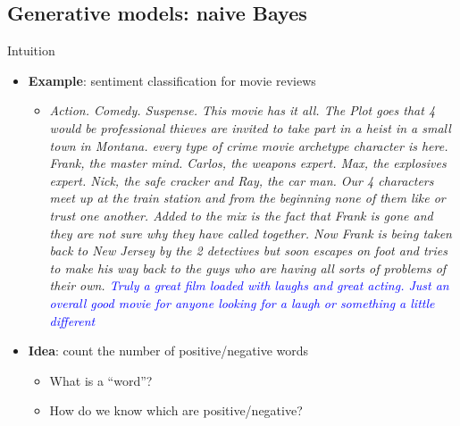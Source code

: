\documentclass[usenames,dvipsnames,notes,11pt,aspectratio=169]{beamer}
\newcommand{\pdfnote}[1]{}
\begin{document}
\subsection{Generative models: naive Bayes}

\begin{frame}
    {Intuition}
    \begin{itemize}
        \itemsep1em
        \item \textbf{Example}: sentiment classification for movie reviews
    \begin{itemize}
        \item[] {\small {} \textit{Action. Comedy. Suspense. This movie has it
all. The Plot goes that 4 would be
professional thieves are invited to take part in a
heist in a small town in Montana. every type of
crime movie archetype character is here. Frank,
the master mind. Carlos, the weapons expert. Max,
the explosives expert. Nick, the safe cracker and
Ray, the car man. Our 4 characters meet up at the train station
and from the beginning none of them like or trust
one another. Added to the mix is the fact that
Frank is gone and they are not sure why they have
called together. Now Frank is being
taken back to New Jersey by the 2 detectives but
soon escapes on foot and tries to make his way
back to the guys who are having all sorts of
            problems of their own. \textcolor<2->{blue}{Truly a great
film loaded with laughs and great acting. Just an
overall good movie for anyone looking for a laugh
            or something a little different}}\par}
    \end{itemize}
    \pause
\item \textbf{Idea}: count the number of positive/negative words
    \pause
    \begin{itemize}
        \item What is a ``word''?
        \item How do we know which are positive/negative?
    \end{itemize}

    \end{itemize}
    \pdfnote{
        How would you quickly tell the sentiment of this review?
        Understand everything said in it is hard (genre, plot, actor performance etc.).
        But sometimes a couple of keywords or a concluding sentence is sufficient.
    }
    \pdfnote{
        Now there are two questions left.
        We know what's a word intuitively, but to the computer the input is just a string of unicodes, how can we separate that into a list of words.
        The second question is how can we tell which words are positive or negative. The rule based approach is to construct a dictionary of such words, which can be quite effective.
        But here we'll see how to learn this from labeled data.
    }
\end{frame}
\end{document}
